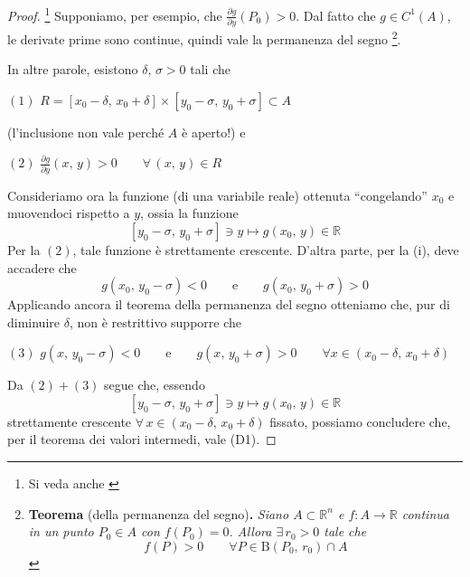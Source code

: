 \begin{proof}\footnote{Si veda anche \cite{Conti1993}}
Supponiamo, per esempio, che $\frac{\partial g}{\partial y} (P_0) > 0$. Dal fatto che $g \in C^1(A)$, le derivate prime sono continue, quindi vale la permanenza del segno \footnote{
\textbf{Teorema }\textnormal{(della permanenza del segno)}\textbf{.}\textit{
Siano $A \subset \mathbb{R}^n$ e $f : A \longrightarrow \mathbb{R}$ continua in un punto $P_0 \in A$ con $f(P_0) = 0$. Allora $\exists \, r_0 > 0$ tale che
$$
f(P) > 0 \qquad \forall P \in \mathrm{B}(P_0,\,r_0) \cap A
$$
}}.
\begin{center}
\def\svgwidth{10cm}

\end{center}
In altre parole, esistono $\delta,\,\sigma > 0$ tali che
\begin{center}
$\mathrm{(1)}$
\hfill
$\displaystyle
R = [x_0 - \delta,\, x_0 + \delta] \times [y_0 - \sigma,\, y_0 + \sigma] \subset A
$
\hfill \null \\
\end{center}
(l'inclusione non vale perché $A$ è aperto!) e
\begin{center}
$\mathrm{(2)}$
\hfill
$\displaystyle
\frac{\partial g}{\partial y}(x,\,y) > 0 \qquad \forall \, (x,\,y) \in R
$
\hfill \null \\
\end{center}
Consideriamo ora la funzione (di una variabile reale) ottenuta ``congelando'' $x_0$ e muovendoci rispetto a $y$, ossia la funzione
$$
[y_0-\sigma,\,y_0+\sigma] \ni y \longmapsto g(x_0,\,y) \in \mathbb{R}
$$
Per la $\mathrm{(2)}$, tale funzione è strettamente crescente. D'altra parte, per la (i), deve accadere che
$$
g(x_0,\,y_0-\sigma) < 0 \qquad \text{e} \qquad g(x_0,\,y_0+\sigma) > 0
$$
Applicando ancora il teorema della permanenza del segno otteniamo che, pur di diminuire $\delta$, non è restrittivo supporre che
\begin{center}
$\mathrm{(3)}$
\hfill
$\displaystyle
g(x,\,y_0-\sigma) < 0 \qquad \text{e} \qquad g(x,\,y_0+\sigma) > 0
\qquad \forall x \in (x_0-\delta,\, x_0+\delta)
$
\hfill \null \\
\end{center}
Da $\mathrm{(2)}+\mathrm{(3)}$ segue che, essendo
$$
[y_0-\sigma,\,y_0+\sigma] \ni y \longmapsto g(x_0,\,y) \in \mathbb{R}
$$
strettamente crescente $\forall \, x \in (x_0-\delta,\, x_0+\delta)$ fissato, possiamo concludere che, per il teorema dei valori intermedi, vale (D1).


\end{proof}
